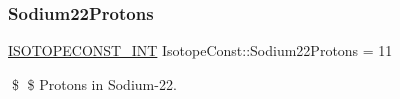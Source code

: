 \subsubsection{\texorpdfstring{Sodium22\+Protons}{Sodium22Protons}}
{\footnotesize\ttfamily \mbox{\hyperlink{group___isotope_const-_macros_ga5f18360b3e99483a35c32d789e62621c}{I\+S\+O\+T\+O\+P\+E\+C\+O\+N\+S\+T\+\_\+\+I\+NT}} Isotope\+Const\+::\+Sodium22\+Protons = 11}

\$ \$ Protons in Sodium-\/22. 